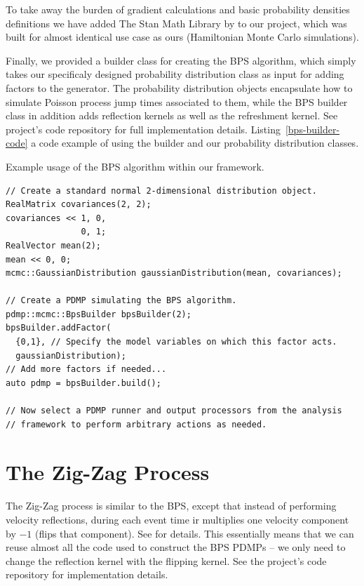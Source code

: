 \documentclass[report.tex]{subfiles}
\begin{document}
To take away the burden of gradient calculations and basic probability densities definitions
we have added The Stan Math Library by \citet{carpenter2015stan} to our project, which was
built for almost identical use case as ours (Hamiltonian Monte Carlo simulations).

Finally, we provided a builder class for creating the BPS algorithm, which simply takes
our specificaly designed probability distribution class as input for adding factors to the generator.
The probability distribution objects encapsulate how to simulate Poisson process jump times
associated to them, while the BPS builder class in addition adds reflection kernels as well
as the refreshment kernel.
See project's code repository for full implementation details.
Listing~\ref{bps-builder-code} a code example of using the builder and our probability
distribution classes.

\begin{lstfloat}
\caption{Example usage of the BPS algorithm within our framework.}
\label{bps-builder-code}
\begin{lstlisting}
// Create a standard normal 2-dimensional distribution object.
RealMatrix covariances(2, 2);
covariances << 1, 0,
               0, 1;
RealVector mean(2);
mean << 0, 0;
mcmc::GaussianDistribution gaussianDistribution(mean, covariances);

// Create a PDMP simulating the BPS algorithm.
pdmp::mcmc::BpsBuilder bpsBuilder(2);
bpsBuilder.addFactor(
  {0,1}, // Specify the model variables on which this factor acts.
  gaussianDistribution);
// Add more factors if needed...
auto pdmp = bpsBuilder.build();

// Now select a PDMP runner and output processors from the analysis
// framework to perform arbitrary actions as needed.
\end{lstlisting}
\end{lstfloat}

\section{The Zig-Zag Process}

The Zig-Zag process is similar to the BPS, except that instead of performing
velocity reflections, during each event time ir multiplies one velocity component
by $-1$ (flips that component). See \citet{bierkens2016zig} for details.
This essentially means that we can reuse almost all the code used to construct
the BPS PDMPs -- we only need to change the reflection kernel with the flipping
kernel. See the project's code repository for implementation details.
\end{document}
